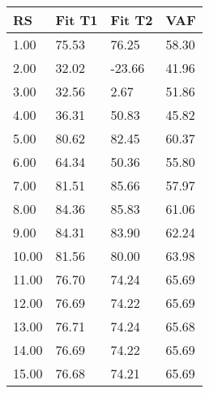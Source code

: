 \begin{tabular}{llll}
RS & Fit T1 & Fit T2 & VAF \\ 
\hline 
 1.00 & 75.53 &  76.25 & 58.30 \\ 
 2.00 & 32.02 & -23.66 & 41.96 \\ 
 3.00 & 32.56 &   2.67 & 51.86 \\ 
 4.00 & 36.31 &  50.83 & 45.82 \\ 
 5.00 & 80.62 &  82.45 & 60.37 \\ 
 6.00 & 64.34 &  50.36 & 55.80 \\ 
 7.00 & 81.51 &  85.66 & 57.97 \\ 
 8.00 & 84.36 &  85.83 & 61.06 \\ 
 9.00 & 84.31 &  83.90 & 62.24 \\ 
10.00 & 81.56 &  80.00 & 63.98 \\ 
11.00 & 76.70 &  74.24 & 65.69 \\ 
12.00 & 76.69 &  74.22 & 65.69 \\ 
13.00 & 76.71 &  74.24 & 65.68 \\ 
14.00 & 76.69 &  74.22 & 65.69 \\ 
15.00 & 76.68 &  74.21 & 65.69 \\ 
\hline 
\end{tabular}